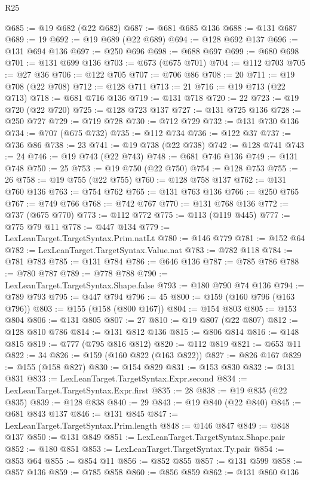 \begin{lexlean}{R25}
\begin{coremodule}
@685 := @19 @682 (@22 @682)
@687 := @681 @685 @136
@688 := @131 @687
@689 := 19
@692 := @19 @689 (@22 @689)
@694 := @128 @692 @137
@696 := @131 @694 @136
@697 := @250 @696
@698 := @688 @697
@699 := @680 @698
@701 := @131 @699 @136
@703 := @673 (@675 @701)
@704 := @112 @703
@705 := @27 @36
@706 := @122 @705
@707 := @706 @86
@708 := 20
@711 := @19 @708 (@22 @708)
@712 := @128 @711
@713 := 21
@716 := @19 @713 (@22 @713)
@718 := @681 @716 @136
@719 := @131 @718
@720 := 22
@723 := @19 @720 (@22 @720)
@725 := @128 @723 @137
@727 := @131 @725 @136
@728 := @250 @727
@729 := @719 @728
@730 := @712 @729
@732 := @131 @730 @136
@734 := @707 (@675 @732)
@735 := @112 @734
@736 := @122 @37
@737 := @736 @86
@738 := 23
@741 := @19 @738 (@22 @738)
@742 := @128 @741
@743 := 24
@746 := @19 @743 (@22 @743)
@748 := @681 @746 @136
@749 := @131 @748
@750 := 25
@753 := @19 @750 (@22 @750)
@754 := @128 @753
@755 := 26
@758 := @19 @755 (@22 @755)
@760 := @128 @758 @137
@762 := @131 @760 @136
@763 := @754 @762
@765 := @131 @763 @136
@766 := @250 @765
@767 := @749 @766
@768 := @742 @767
@770 := @131 @768 @136
@772 := @737 (@675 @770)
@773 := @112 @772
@775 := @113 (@119 @445)
@777 := @775 @79 @11
@778 := @447 @134
@779 := LexLeanTarget.TargetSyntax.Prim.natLt
@780 := @146 @779
@781 := @152 @64
@782 := LexLeanTarget.TargetSyntax.Value.nat
@783 := @782 @118
@784 := @781 @783
@785 := @131 @784
@786 := @646 @136
@787 := @785 @786
@788 := @780 @787
@789 := @778 @788
@790 := LexLeanTarget.TargetSyntax.Shape.false
@793 := @180 @790 @74 @136
@794 := @789 @793
@795 := @447 @794
@796 := 45
@800 := @159 (@160 @796 (@163 @796))
@803 := @155 (@158 (@800 @167))
@804 := @154 @803
@805 := @153 @804
@806 := @131 @805
@807 := 27
@810 := @19 @807 (@22 @807)
@812 := @128 @810 @786
@814 := @131 @812 @136
@815 := @806 @814
@816 := @148 @815
@819 := @777 (@795 @816 @812)
@820 := @112 @819
@821 := @653 @11
@822 := 34
@826 := @159 (@160 @822 (@163 @822))
@827 := @826 @167
@829 := @155 (@158 @827)
@830 := @154 @829
@831 := @153 @830
@832 := @131 @831
@833 := LexLeanTarget.TargetSyntax.Expr.second
@834 := LexLeanTarget.TargetSyntax.Expr.first
@835 := 28
@838 := @19 @835 (@22 @835)
@839 := @128 @838
@840 := 29
@843 := @19 @840 (@22 @840)
@845 := @681 @843 @137
@846 := @131 @845
@847 := LexLeanTarget.TargetSyntax.Prim.length
@848 := @146 @847
@849 := @848 @137
@850 := @131 @849
@851 := LexLeanTarget.TargetSyntax.Shape.pair
@852 := @180 @851
@853 := LexLeanTarget.TargetSyntax.Ty.pair
@854 := @853 @64
@855 := @854 @11
@856 := @852 @855
@857 := @131 @599
@858 := @857 @136
@859 := @785 @858
@860 := @856 @859
@862 := @131 @860 @136

\end{coremodule}
\end{lexlean}
